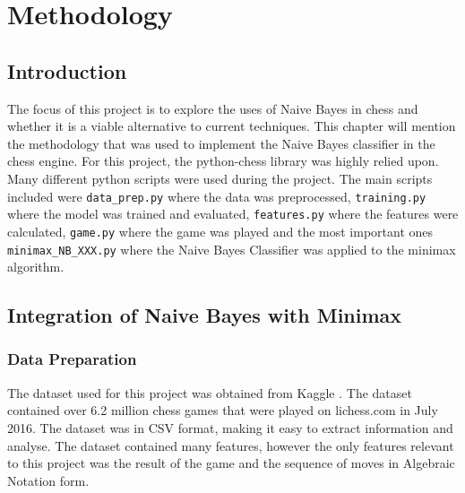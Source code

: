 \chapter{Methodology}

\section{Introduction}
The focus of this project is to explore the uses of Naive Bayes in chess and whether it is a viable alternative to current techniques. This chapter will mention the methodology that was used to implement the Naive Bayes classifier in the chess engine. For this project, the python-chess library was highly relied upon. Many different python scripts were used during the project. The main scripts included were \texttt{data\_prep.py} where the data was preprocessed, \texttt{training.py} where the model was trained and evaluated, \texttt{features.py} where the features were calculated, \texttt{game.py} where the game was played and the most important ones \texttt{minimax\_NB\_XXX.py} where the Naive Bayes Classifier was applied to the minimax algorithm.


\section{Integration of Naive Bayes with Minimax}

\subsection{Data Preparation}

The dataset used for this project was obtained from Kaggle \cite{ChessGameDataset}. The dataset contained over 6.2 million chess games that were played on lichess.com in July 2016. The dataset was in CSV format, making it easy to extract information and analyse. The dataset contained many features, however the only features relevant to this project was the result of the game and the sequence of moves in Algebraic Notation form.

